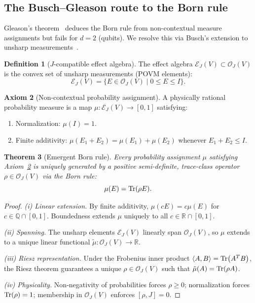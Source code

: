 \documentclass[aps,prd,twocolumn,superscriptaddress,nofootinbib]{revtex4-2}
\newtheorem{theorem}{Theorem}[section]
\theoremstyle{definition}
\newtheorem{definition}[theorem]{Definition}
\newtheorem{axiom}[theorem]{Axiom}
\theoremstyle{remark}
\newcommand{\R}{\mathbb{R}}
\newcommand{\OJ}{\mathcal{O}_J}
\newcommand{\EJ}{\mathcal{E}_J}
\begin{document}
\subsection{The Busch--Gleason route to the Born rule}

Gleason's theorem~\cite{Gleason1957} deduces the Born rule from
non-contextual measure assignments but fails for $d = 2$ (qubits). We
resolve this via Busch's extension to unsharp measurements~\cite{Busch2003}.

\begin{definition}[$J$-compatible effect algebra]
\label{def:effect_algebra}
The effect algebra $\EJ(V) \subset \OJ(V)$ is the convex set of unsharp
measurements (POVM elements):
\begin{equation}
\EJ(V) = \{ E \in \OJ(V) \mid 0 \leq E \leq I \}.
\label{eq:effect_algebra}
\end{equation}
\end{definition}

\begin{axiom}[Non-contextual probability assignment]
\label{ax:noncontextual}
A physically rational probability measure is a map
$\mu : \EJ(V) \to [0,1]$ satisfying:
\begin{enumerate}
\item Normalization: $\mu(I) = 1$.
\item Finite additivity: $\mu(E_1 + E_2) = \mu(E_1) + \mu(E_2)$
whenever $E_1 + E_2 \leq I$.
\end{enumerate}
\end{axiom}

\begin{theorem}[Emergent Born rule]
\label{thm:born_rule}
Every probability assignment $\mu$ satisfying Axiom~\ref{ax:noncontextual}
is uniquely generated by a positive semi-definite, trace-class operator
$\rho \in \OJ(V)$ via the Born rule:
\begin{equation}
\mu(E) = \Tr(\rho E).
\label{eq:born_rule}
\end{equation}
\end{theorem}

\begin{proof}
\textit{(i) Linear extension.} By finite additivity, $\mu(cE) = c\mu(E)$
for $c \in \mathbb{Q} \cap [0,1]$. Boundedness extends $\mu$ uniquely to
all $c \in \R \cap [0,1]$.

\textit{(ii) Spanning.} The unsharp elements $\EJ(V)$ linearly span
$\OJ(V)$, so $\mu$ extends to a unique linear functional
$\tilde{\mu} : \OJ(V) \to \R$.

\textit{(iii) Riesz representation.} Under the Frobenius inner product
$\langle A, B \rangle = \Tr(A^T B)$, the Riesz theorem guarantees a unique
$\rho \in \OJ(V)$ such that $\tilde{\mu}(A) = \Tr(\rho A)$.

\textit{(iv) Physicality.} Non-negativity of probabilities forces
$\rho \geq 0$; normalization forces $\Tr(\rho) = 1$; membership in
$\OJ(V)$ enforces $[\rho, J] = 0$.
\end{proof}
\end{document}
